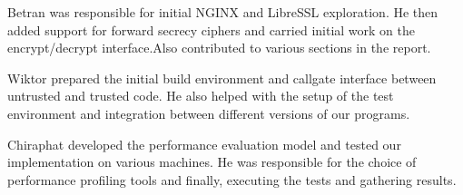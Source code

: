 \documentclass[../main.tex]{subfiles}
\begin{document}
Betran was responsible for initial NGINX and LibreSSL exploration. He then
added support for forward secrecy ciphers and carried initial work on the
encrypt/decrypt interface.Also contributed to various sections in the report. 

Wiktor prepared the initial build environment and callgate interface between
untrusted and trusted code. He also helped with the setup of the test
environment and integration between different versions of our programs.

Chiraphat developed the performance evaluation model and tested our
implementation on various machines. He was responsible for the choice of
performance profiling tools and finally, executing the tests and gathering
results.
\end{document}
